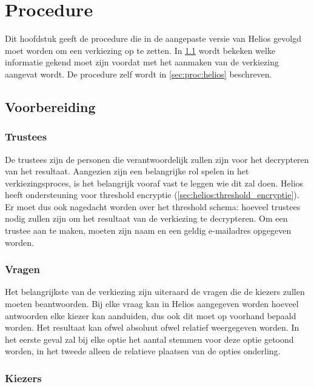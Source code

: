 % 
%

\chapter{Procedure}
\label{chap:procedure}

Dit hoofdstuk geeft de procedure die in de aangepaste versie van Helios gevolgd moet worden om een verkiezing op te zetten. In \ref{sec:proc:voorbereiding} wordt bekeken welke informatie gekend moet zijn voordat met het aanmaken van de verkiezing aangevat wordt. De procedure zelf wordt in \ref{sec:proc:helios} beschreven.

\section{Voorbereiding}
\label{sec:proc:voorbereiding}

\subsection{Trustees}

De trustees zijn de personen die verantwoordelijk zullen zijn voor het decrypteren van het resultaat. Aangezien zijn een belangrijke rol spelen in het verkiezingsproces, is het belangrijk vooraf vast te leggen wie dit zal doen. Helios heeft ondersteuning voor threshold encryptie (\ref{sec:helios:threshold_encryptie}). Er moet dus ook nagedacht worden over het threshold schema: hoeveel trustees nodig zullen zijn om het resultaat van de verkiezing te decrypteren. Om een trustee aan te maken, moeten zijn naam en een geldig e-mailadres opgegeven worden.

\subsection{Vragen}
\label{sec:proc:voorbereiding:vragen}

Het belangrijkste van de verkiezing zijn uiteraard de vragen die de kiezers zullen moeten beantwoorden. Bij elke vraag kan in Helios aangegeven worden hoeveel antwoorden elke kiezer kan aanduiden, dus ook dit moet op voorhand bepaald worden. Het resultaat kan ofwel absoluut ofwel relatief weergegeven worden. In het eerste geval zal bij elke optie het aantal stemmen voor deze optie getoond worden, in het tweede alleen de relatieve plaatsen van de opties onderling.

\subsection{Kiezers}
\label{sec:proc:voorbereiding:kiezers}

